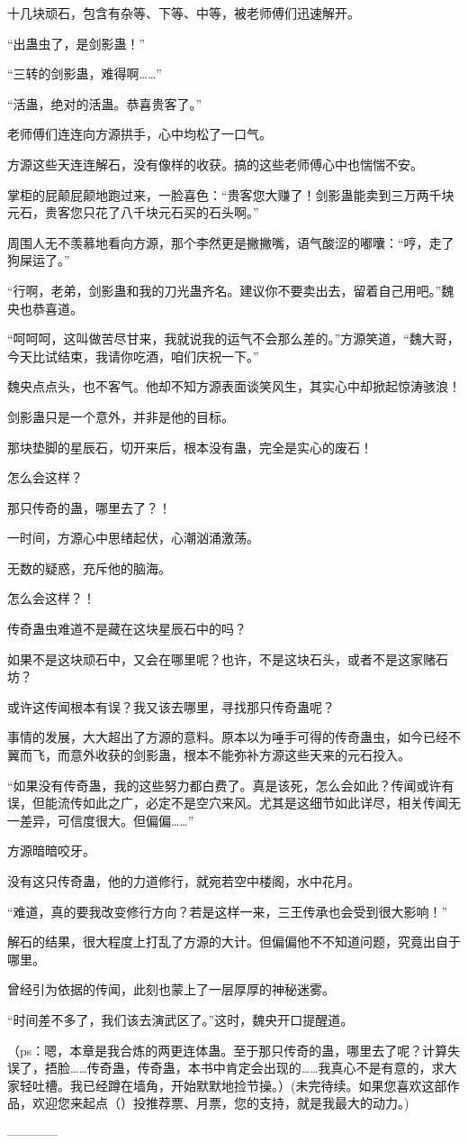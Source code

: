 \begin{this_body}
十几块顽石，包含有杂等、下等、中等，被老师傅们迅速解开。

“出蛊虫了，是剑影蛊！”

“三转的剑影蛊，难得啊……”

“活蛊，绝对的活蛊。恭喜贵客了。”

老师傅们连连向方源拱手，心中均松了一口气。

方源这些天连连解石，没有像样的收获。搞的这些老师傅心中也惴惴不安。

掌柜的屁颠屁颠地跑过来，一脸喜色：“贵客您大赚了！剑影蛊能卖到三万两千块元石，贵客您只花了八千块元石买的石头啊。”

周围人无不羡慕地看向方源，那个李然更是撇撇嘴，语气酸涩的嘟囔：“哼，走了狗屎运了。”

“行啊，老弟，剑影蛊和我的刀光蛊齐名。建议你不要卖出去，留着自己用吧。”魏央也恭喜道。

“呵呵呵，这叫做苦尽甘来，我就说我的运气不会那么差的。”方源笑道，“魏大哥，今天比试结束，我请你吃酒，咱们庆祝一下。”

魏央点点头，也不客气。他却不知方源表面谈笑风生，其实心中却掀起惊涛骇浪！

剑影蛊只是一个意外，并非是他的目标。

那块垫脚的星辰石，切开来后，根本没有蛊，完全是实心的废石！

怎么会这样？

那只传奇的蛊，哪里去了？！

一时间，方源心中思绪起伏，心潮汹涌激荡。

无数的疑惑，充斥他的脑海。

怎么会这样？！

传奇蛊虫难道不是藏在这块星辰石中的吗？

如果不是这块顽石中，又会在哪里呢？也许，不是这块石头，或者不是这家赌石坊？

或许这传闻根本有误？我又该去哪里，寻找那只传奇蛊呢？

事情的发展，大大超出了方源的意料。原本以为唾手可得的传奇蛊虫，如今已经不翼而飞，而意外收获的剑影蛊，根本不能弥补方源这些天来的元石投入。

“如果没有传奇蛊，我的这些努力都白费了。真是该死，怎么会如此？传闻或许有误，但能流传如此之广，必定不是空穴来风。尤其是这细节如此详尽，相关传闻无一差异，可信度很大。但偏偏……”

方源暗暗咬牙。

没有这只传奇蛊，他的力道修行，就宛若空中楼阁，水中花月。

“难道，真的要我改变修行方向？若是这样一来，三王传承也会受到很大影响！”

解石的结果，很大程度上打乱了方源的大计。但偏偏他不不知道问题，究竟出自于哪里。

曾经引为依据的传闻，此刻也蒙上了一层厚厚的神秘迷雾。

“时间差不多了，我们该去演武区了。”这时，魏央开口提醒道。

（ps：嗯，本章是我合炼的两更连体蛊。至于那只传奇的蛊，哪里去了呢？计算失误了，捂脸……传奇蛊，传奇蛊，本书中肯定会出现的……我真心不是有意的，求大家轻吐槽。我已经蹲在墙角，开始默默地捡节操。）(未完待续。如果您喜欢这部作品，欢迎您来起点（）投推荐票、月票，您的支持，就是我最大的动力。)

------------

\end{this_body}

